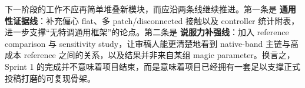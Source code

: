 \documentclass[11pt,a4paper]{ctexart}
\begin{document}
下一阶段的工作不应再简单堆叠新模块，而应沿两条线继续推进。第一条是 \textbf{通用性证据线}：补充偏心 flat、多 patch/disconnected 接触以及 controller 统计附表，进一步支撑“无特调通用框架”的论点。第二条是 \textbf{说服力补强线}：加入 reference comparison 与 sensitivity study，让审稿人能更清楚地看到 native-band 主链与高成本 reference 之间的关系，以及结果并非来自某组 magic parameter。换言之，Sprint 1 的完成并不意味着项目结束，而是意味着项目已经拥有一套足以支撑正式投稿打磨的可复现骨架。
\end{document}
